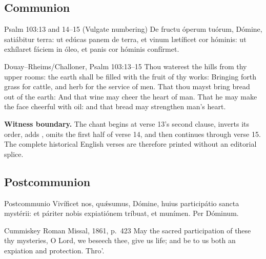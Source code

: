 \elementguard
\subsection*{Communion }
\begin{appointedlatin}{Psalm 103:13 and 14--15 (Vulgate numbering)}
De fructu óperum tuórum, Dómine, satiábitur terra: ut edúcas panem de terra,
et vinum lætíficet cor hóminis: ut exhílaret fáciem in óleo, et panis cor
hóminis confírmet.
\end{appointedlatin}
\begin{namedtranslation}{Douay--Rheims/Challoner, Psalm 103:13--15}
Thou waterest the hills from thy upper rooms: the earth shall be filled with
the fruit of thy works: Bringing forth grass for cattle, and herb for the
service of men. That thou mayst bring bread out of the earth: And that wine may
cheer the heart of man. That he may make the face cheerful with oil: and that
bread may strengthen man's heart.

\textbf{Witness boundary.} The chant begins at verse 13's second clause,
inverts its order, adds , omits the first half of verse 14, and
then continues through verse 15. The complete historical English verses are
therefore printed without an editorial splice.
\end{namedtranslation}

\elementguard
\subsection*{Postcommunion }
\begin{appointedlatin}{Postcommunio}
Vivíficet nos, quǽsumus, Dómine, huius participátio sancta mystérii: et
páriter nobis expiatiónem tríbuat, et munímen. Per Dóminum.
\end{appointedlatin}
\begin{namedtranslation}{Cummiskey Roman Missal, 1861, p.~423}
May the sacred participation of these thy mysteries, O Lord, we beseech thee,
give us life; and be to us both an expiation and protection. Thro'.
\end{namedtranslation}
